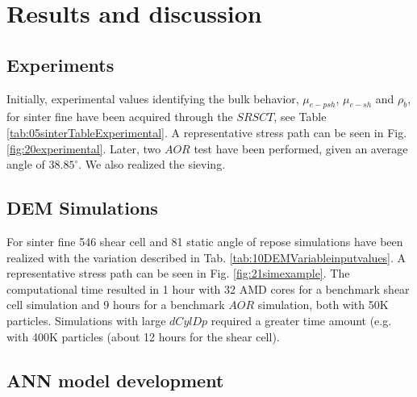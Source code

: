 \section{Results and discussion}
\label{sec:results}

\subsection{Experiments}
\label{subsec:experiments}

Initially, experimental values identifying the bulk behavior, $\mu_{e-psh}$, $\mu_{e-sh}$ and $\rho_{b}$, 
for sinter fine have been acquired through the $SRSCT$, see Table
\ref{tab:05sinterTableExperimental}.
A representative stress path can be seen in Fig. \ref{fig:20experimental}.
%
Later, two $AOR$ test have been performed, given an average angle of $38.85
^\circ$.
We also realized the sieving.


\subsection{DEM Simulations}
\label{subsec:simulations}

For sinter fine 546 shear cell and 81 static angle of repose simulations have
been realized with the variation described in Tab.
\ref{tab:10DEMVariableinputvalues}.
A representative stress path can be seen in Fig. \ref{fig:21simexample}.
The computational time resulted in 1 hour with 32 AMD cores for a benchmark
shear cell simulation and 9 hours for a benchmark $AOR$ simulation, both with 50K particles. 
Simulations with large $dCylDp$ required a greater time amount (e.g. with 400K
particles (about 12 hours for the shear cell). \\


\subsection{ANN model development}
\label{subsec:annmodeldev}

